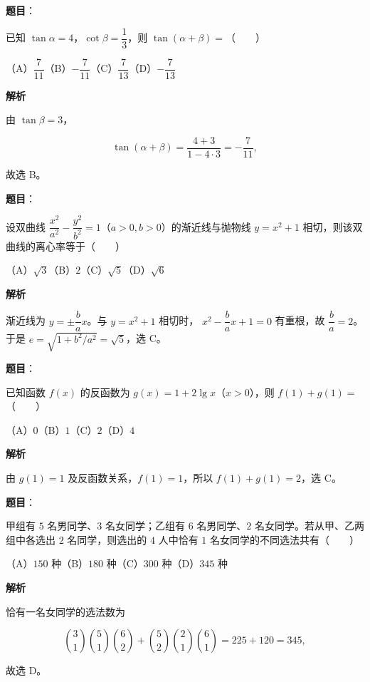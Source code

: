 \begin{answer}

\textbf{题目}：

已知 $\tan\alpha=4$，$\cot\beta=\dfrac13$，则 $\tan(\alpha+\beta)=$\mbox{（　　）}

（A）$\dfrac7{11}$\quad（B）$-\dfrac7{11}$\quad（C）$\dfrac7{13}$\quad（D）$-\dfrac7{13}$

\textbf{解析}

由 $\tan\beta=3$，

\nopagebreak[4]
\[
\tan(\alpha+\beta)=\frac{4+3}{1-4\cdot3}=-\frac7{11},
\]

故选 B。


\end{answer}
\begin{answer}

\textbf{题目}：

设双曲线 $\dfrac{x^2}{a^2}-\dfrac{y^2}{b^2}=1$（$a>0,b>0$）的渐近线与抛物线 $y=x^2+1$ 相切，则该双曲线的离心率等于\mbox{（　　）}

（A）$\sqrt3$\quad（B）$2$\quad（C）$\sqrt5$\quad（D）$\sqrt6$

\textbf{解析}

渐近线为 $y=\pm\dfrac ba x$。与 $y=x^2+1$ 相切时，
$x^2-\dfrac ba x+1=0$ 有重根，故 $\dfrac ba=2$。于是
$e=\sqrt{1+b^2/a^2}=\sqrt5$，选 C。


\end{answer}
\begin{answer}

\textbf{题目}：

已知函数 $f(x)$ 的反函数为 $g(x)=1+2\lg x$（$x>0$），则 $f(1)+g(1)=$\mbox{（　　）}

（A）$0$\quad（B）$1$\quad（C）$2$\quad（D）$4$

\textbf{解析}

由 $g(1)=1$ 及反函数关系，$f(1)=1$，所以 $f(1)+g(1)=2$，选 C。


\end{answer}
\begin{answer}

\textbf{题目}：

甲组有 $5$ 名男同学、$3$ 名女同学；乙组有 $6$ 名男同学、$2$ 名女同学。若从甲、乙两组中各选出 $2$ 名同学，则选出的 $4$ 人中恰有 $1$ 名女同学的不同选法共有\mbox{（　　）}

（A）$150$ 种\quad（B）$180$ 种\quad（C）$300$ 种\quad（D）$345$ 种

\textbf{解析}

恰有一名女同学的选法数为

\nopagebreak[4]
\[
\binom31\binom51\binom62+\binom52\binom21\binom61
=225+120=345,
\]

故选 D。


\end{answer}
